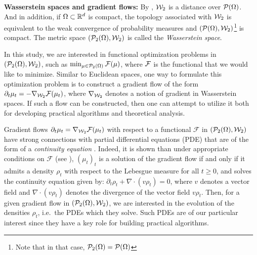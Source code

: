 \textbf{Wasserstein spaces and gradient flows: }
%
By \cite[Proposition 7.1.5]{ambrosio2008gradient}, ${\cal W}_2$ is a distance over ${\cal P}(\Omega)$.
And in addition, if $\Omega \subset \mathbb{R}^d$ is compact, the topology associated with ${\cal W}_2$ is equivalent to the weak convergence of probability measures and $({\cal P}(\Omega),{\cal W}_2)$\footnote{Note that in that case, ${\cal P}_2(\Omega)={\cal P}(\Omega)$} is compact. The metric space $({\cal P}_2(\Omega),{\cal W}_2) $ is called the \emph{Wasserstein space}.

In this study, we are interested in functional optimization problems in $({\cal P}_2(\Omega),{\cal W}_2)$, such as $\min_{\mu\in{\cal P}_2(\Omega)} {\cal F}(\mu)$, where ${\cal F}$ is the functional that we would like to minimize. Similar to Euclidean spaces, one way to formulate this optimization problem is to construct a gradient flow of the form $\partial_t \mu_t = - \nabla_{{\cal W}_2} {\cal F}(\mu_t)$, where $\nabla_{{\cal W}_2}$ denotes a notion of gradient in Wasserstein spaces. If such a flow can be constructed, then one can attempt to utilize it both for developing practical algorithms and theoretical analysis.

Gradient flows $\partial_t \mu_t = \nabla_{{\cal W}_2} \mathcal{F}(\mu_t)$ with respect to a functional $\mathcal{F}$ in $({\cal P}_2(\Omega),{\cal W}_2)$ have strong connections with partial differential equations (PDE) that are of the form of a \emph{continuity equation} \cite{santambrogio2017euclidean}. Indeed, it is shown than under appropriate conditions on $\mathcal{F}$ (see \eg \cite{ambrosio2008gradient}), $(\mu_t)_t$ is a solution of the gradient flow if and only if it admits a density $\rho_t$ with respect to the Lebesgue measure for all $t \geq 0$, and solves the continuity equation given by:
$\partial_t \rho_t + \nabla \cdot (v \rho_t) = 0$, %
where $v$ denotes a vector field and $\nabla \cdot (v \rho_t)$ denotes the divergence of the vector field $v\rho_t$. Then, for a given gradient flow in $({\cal P}_2(\Omega),{\cal W}_2)$, we are interested in the evolution of the densities $\rho_t$, i.e.\ the PDEs which they solve.
%
%
Such PDEs are of our particular interest since they have a key role for building practical algorithms.

